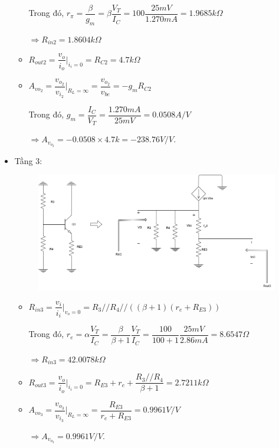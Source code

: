 \begin{itemize}[label=-]
\begin{itemize}[label = +]
		Trong đó, $r_{\pi} = \dfrac{\beta}{g_{m}} = \beta \dfrac{V_{T}}{I_{C}} = 100 \dfrac{25mV}{1.270mA} = 1.9685k\Omega$
		
		$\Rightarrow R_{in2} = 1.8604k\Omega$
		\item $R_{out2} = \dfrac{v_{o}}{i_{o}}|_{i_{i} = 0} = R_{C2} = 4.7k \Omega$
		\item $A_{vo_{2}} = \dfrac{v_{o_{2}}}{v_{i_{2}}}|_{R_{L} = \infty} = \dfrac{v_{o_{2}}}{v_{be}} = -g_{m}R_{C2}$
		
		Trong đó, $g_{m} = \dfrac{I_{C}}{V_{T}} = \dfrac{1.270mA}{25mV} = 0.0508 A/V$
		
		$\Rightarrow A_{v_{o_{2}}} = -0.0508\times 4.7k = -238.76 V/V$.
	\end{itemize}
	
	\item Tầng 3:
	
	\begin{figure}[H]
		\centering
		\includegraphics[width=.7\linewidth]{./my-chapters/my-diagrams/Question6/caub_stage3.png}
	\end{figure}
	
	\begin{itemize}[label = +]
		\item $R_{in3} = \dfrac{v_{i}}{i_{i}}|_{v_{o}=0} = R_{3} // R_{4} // ((\beta + 1)(r_{e} + R_{E3}))$
		
		Trong đó, $r_{e} = \alpha\dfrac{V_{T}}{I_{C}} = \dfrac{\beta}{\beta + 1}\dfrac{V_{T}}{I_{C}} = \dfrac{100}{100+1} \dfrac{25mV}{2.86mA} = 8.6547\Omega$
		
		$\Rightarrow R_{in3} = 42.0078k\Omega$
		\item $R_{out3} = \dfrac{v_{o}}{i_{o}}|_{i_{i} = 0} = R_{E3} + r_{e} + \dfrac{R_{3}//R_{4}}{\beta + 1} = 2.7211k\Omega$
		\item $A_{vo_{3}} = \dfrac{v_{o_{3}}}{v_{i_{3}}}|_{R_{L} = \infty} = \dfrac{R_{E3}}{r_{e} + R_{E3}} = 0.9961 V/V$
		
		$\Rightarrow A_{v_{o_{3}}} = 0.9961 V/V$.
	\end{itemize}
\end{itemize}

